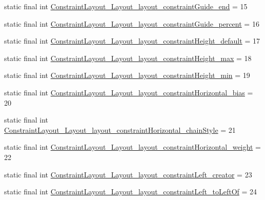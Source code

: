 \begin{DoxyCompactItemize}
static final int \mbox{\hyperlink{classandroid_1_1support_1_1constraint_1_1R_1_1styleable_afd7624a026a509c404645497a0052dd5}{Constraint\+Layout\+\_\+\+Layout\+\_\+layout\+\_\+constraint\+Guide\+\_\+end}} = 15
\item 
static final int \mbox{\hyperlink{classandroid_1_1support_1_1constraint_1_1R_1_1styleable_a6cab8737437703bf14820698c4d0c6c1}{Constraint\+Layout\+\_\+\+Layout\+\_\+layout\+\_\+constraint\+Guide\+\_\+percent}} = 16
\item 
static final int \mbox{\hyperlink{classandroid_1_1support_1_1constraint_1_1R_1_1styleable_af7540577551972ec2374d31348e3eb58}{Constraint\+Layout\+\_\+\+Layout\+\_\+layout\+\_\+constraint\+Height\+\_\+default}} = 17
\item 
static final int \mbox{\hyperlink{classandroid_1_1support_1_1constraint_1_1R_1_1styleable_afe4b364679de809df9c8f86c28144c1e}{Constraint\+Layout\+\_\+\+Layout\+\_\+layout\+\_\+constraint\+Height\+\_\+max}} = 18
\item 
static final int \mbox{\hyperlink{classandroid_1_1support_1_1constraint_1_1R_1_1styleable_a1d2cff20e0e8ff949709eb78bae8830b}{Constraint\+Layout\+\_\+\+Layout\+\_\+layout\+\_\+constraint\+Height\+\_\+min}} = 19
\item 
static final int \mbox{\hyperlink{classandroid_1_1support_1_1constraint_1_1R_1_1styleable_afc12da36cc322e5a58b78035b4142fa6}{Constraint\+Layout\+\_\+\+Layout\+\_\+layout\+\_\+constraint\+Horizontal\+\_\+bias}} = 20
\item 
static final int \mbox{\hyperlink{classandroid_1_1support_1_1constraint_1_1R_1_1styleable_a132cd8436999ec88e957f0e5e79ef3c0}{Constraint\+Layout\+\_\+\+Layout\+\_\+layout\+\_\+constraint\+Horizontal\+\_\+chain\+Style}} = 21
\item 
static final int \mbox{\hyperlink{classandroid_1_1support_1_1constraint_1_1R_1_1styleable_a93852127e5a83ad2d9b604d0ed040127}{Constraint\+Layout\+\_\+\+Layout\+\_\+layout\+\_\+constraint\+Horizontal\+\_\+weight}} = 22
\item 
static final int \mbox{\hyperlink{classandroid_1_1support_1_1constraint_1_1R_1_1styleable_a4d519e7863b64a5611de2be8034406e0}{Constraint\+Layout\+\_\+\+Layout\+\_\+layout\+\_\+constraint\+Left\+\_\+creator}} = 23
\item 
static final int \mbox{\hyperlink{classandroid_1_1support_1_1constraint_1_1R_1_1styleable_a3ad07328f29f209d6d553b0b3848f683}{Constraint\+Layout\+\_\+\+Layout\+\_\+layout\+\_\+constraint\+Left\+\_\+to\+Left\+Of}} = 24
\item 

\end{DoxyCompactItemize}
